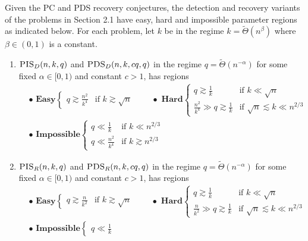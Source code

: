 \documentclass[11pt]{article}
\begin{document}
\begin{theorem}
Given the PC and PDS recovery conjectures, the detection and recovery variants of the problems in Section 2.1 have easy, hard and impossible parameter regions as indicated below. For each problem, let $k$ be in the regime $k = \tilde{\Theta}(n^{\beta})$ where $\beta \in (0, 1)$ is a constant.
\begin{enumerate}
\item $\textsc{PIS}_D(n, k, q)$ and $\textsc{PDS}_D(n, k, cq, q)$ in the regime $q = \tilde{\Theta}(n^{-\alpha})$ for some fixed $\alpha \in [0, 1)$ and constant $c > 1$, has regions
\begin{align*}
&\bullet \, \, \mathbf{Easy} \left\{ \begin{array}{ll} q \gtrsim \frac{n^2}{k^4} &\text{if } k \gtrsim \sqrt{n} \end{array} \right. \quad \quad  \bullet \, \, \mathbf{Hard} \left\{ \begin{array}{ll} q \gtrsim \frac{1}{k} &\text{if } k \ll \sqrt{n} \\ \frac{n^2}{k^4} \gg q \gtrsim \frac{1}{k} &\text{if } \sqrt{n} \lesssim k \ll n^{2/3} \end{array} \right. \\
& \bullet \, \, \mathbf{Impossible} \left\{ \begin{array}{ll} q \ll \frac{1}{k} &\text{if } k \ll n^{2/3} \\ q \ll \frac{n^2}{k^4} &\text{if } k \gtrsim n^{2/3} \end{array} \right.
\end{align*}
\item $\textsc{PIS}_R(n, k, q)$ and $\textsc{PDS}_R(n, k, cq, q)$ in the regime $q = \tilde{\Theta}(n^{-\alpha})$ for some fixed $\alpha \in [0, 1)$ and constant $c > 1$, has regions
\begin{align*}
&\bullet \, \, \mathbf{Easy} \left\{ \begin{array}{ll} q \gtrsim \frac{n}{k^2} &\text{if } k \gtrsim \sqrt{n} \end{array} \right. \quad \quad  \bullet \, \, \mathbf{Hard} \left\{ \begin{array}{ll} q \gtrsim \frac{1}{k} &\text{if } k \ll \sqrt{n} \\ \frac{n}{k^2} \gg q \gtrsim \frac{1}{k} &\text{if } \sqrt{n} \lesssim k \ll n^{2/3} \end{array} \right. \\
& \bullet \, \, \mathbf{Impossible} \left\{ \begin{array}{ll} q \ll \frac{1}{k} \end{array} \right.

\end{align*}
\end{enumerate}
\end{theorem}
\end{document}

